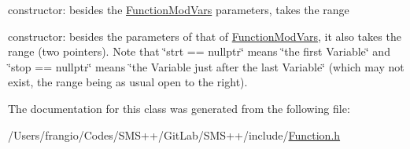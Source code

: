 constructor\+: besides the \mbox{\hyperlink{class_s_m_spp__di__unipi__it_1_1_function_mod_vars}{Function\+Mod\+Vars}} parameters, takes the range 

constructor\+: besides the parameters of that of \mbox{\hyperlink{class_s_m_spp__di__unipi__it_1_1_function_mod_vars}{Function\+Mod\+Vars}}, it also takes the range (two pointers). Note that \char`\"{}strt == nullptr\char`\"{} means \char`\"{}the
first Variable\char`\"{} and \char`\"{}stop == nullptr\char`\"{} means \char`\"{}the Variable just after
the last Variable\char`\"{} (which may not exist, the range being as usual open to the right). 

The documentation for this class was generated from the following file\+:\begin{DoxyCompactItemize}
\item 
/\+Users/frangio/\+Codes/\+S\+M\+S++/\+Git\+Lab/\+S\+M\+S++/include/\mbox{\hyperlink{_function_8h}{Function.\+h}}\end{DoxyCompactItemize}
